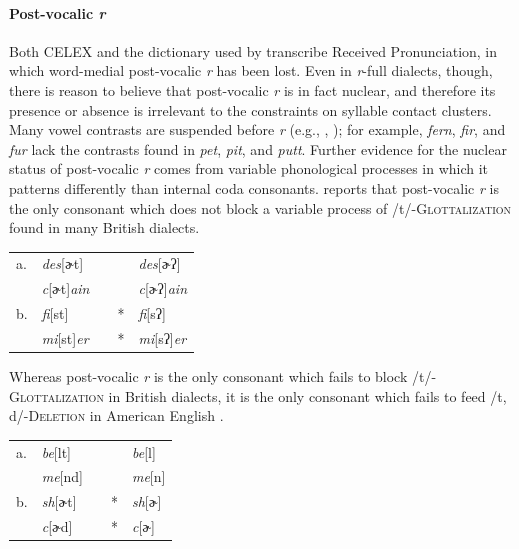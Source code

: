 \paragraph{Post-vocalic \emph{r}} Both CELEX and the dictionary used by \citet{Pierrehumbert1994} transcribe Received Pronunciation, in which word-medial post-vocalic \emph{r} has been lost. Even in \emph{r}-full dialects, though, there is reason to believe that post-vocalic \emph{r} is in fact nuclear, and therefore its presence or absence is irrelevant to the constraints on syllable contact clusters. Many vowel contrasts are suspended before \emph{r} (e.g., \citealt[269f.]{Fudge1969}, \citealt[][255]{Harris1994}); for example, \emph{fern}, \emph{fir}, and \emph{fur} lack the contrasts found in \emph{pet}, \emph{pit}, and \emph{putt}. Further evidence for the nuclear status of post-vocalic \emph{r} comes from variable phonological processes in which it patterns differently than internal coda consonants. \citet[258]{Harris1994} reports that post-vocalic \emph{r} is the only consonant which does not block a variable process of /t/-\textsc{Glottalization} found in many British dialects.

\begin{example}
\begin{tabular}{l l l l@{} l}
a. & \emph{des}[ɚt]         & \alt{} &   & \emph{des}[ɚʔ]         \\
   & \emph{c}[ɚt]\emph{ain} & \alt{} &   & \emph{c}[ɚʔ]\emph{ain} \\
b. & \emph{fi}[st]          & \alt{} & * & \emph{fi}[sʔ]          \\
   & \emph{mi}[st]\emph{er} & \alt{} & * & \emph{mi}[sʔ]\emph{er} \\
\end{tabular}
\end{example}

\noindent Whereas post-vocalic \emph{r} is the only consonant which fails to block /t/-\textsc{Glottalization} in British dialects, it is the only consonant which fails to feed /t, d/-\textsc{Deletion} in American English \citep[8]{Guy1980}.

\begin{example} \label{td}
\begin{tabular}{l l l l@{} l}
a. & \emph{be}[lt] & \alt{} &   & \emph{be}[l] \\
   & \emph{me}[nd] & \alt{} &   & \emph{me}[n] \\
b. & \emph{sh}[ɚt] & \alt{} & * & \emph{sh}[ɚ] \\
   & \emph{c}[ɚd]  & \alt{} & * & \emph{c}[ɚ]  \\
\end{tabular}
\end{example}

